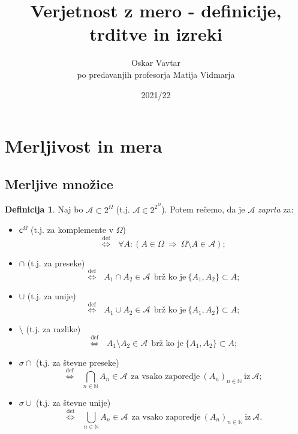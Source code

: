 \documentclass[11pt]{article}
\title{Verjetnost z mero - definicije, trditve in izreki}
\author{Oskar Vavtar \\
po predavanjih profesorja Matija Vidmarja}
\date{2021/22}
\newcommand{\N}{\mathbb{N}}
\newcommand{\A}{\mathcal{A}}
\renewcommand{\c}{\mathsf{c}}
\newcommand{\diff}{\overset{\text{def}}{\iff}}
\newcommand{\imp}{~\Rightarrow~}
\newcommand{\set}[1]{\{#1\}}
\newcommand{\1}{\mathbbm{1}}
\theoremstyle{definition}
\newtheorem{definicija}{Definicija}[section]
\theoremstyle{definition}
\theoremstyle{definition}
\theoremstyle{definition}
\begin{document}
\maketitle
\pagebreak
\tableofcontents
\pagebreak


\section{Merljivost in mera}
\vspace{0.5cm}


\subsection{Merljive množice}
\vspace{0.5cm}

\begin{definicija}

Naj bo $\A \subset 2^\Omega$ (t.j. $\A \in 2^{2^\Omega}$). Potem rečemo, da je $\A$ \textit{zaprta} za:
\begin{itemize}

\item $\c^\Omega$ (t.j. za komplemente v $\Omega$) 
$$\diff ~~~\forall A: (A \in \Omega \imp \Omega \setminus A \in \A);$$

\item $\cap$ (t.j. za preseke)
$$\diff ~~~A_1 \cap A_2 \in \A ~~\text{brž ko je}~ \set{A_1,A_2} \subset A;$$

\item $\cup$ (t.j. za unije)
$$\diff ~~~A_1 \cup A_2 \in \A ~~\text{brž ko je}~ \set{A_1,A_2} \subset A;$$

\item $\setminus$ (t.j. za razlike)
$$\diff ~~~A_1 \setminus A_2 \in \A ~~\text{brž ko je}~ \set{A_1,A_2} \subset A;$$

\item $\sigma\cap$ (t.j. za števne preseke)
$$\diff ~~~\bigcap_{n\in\N} A_n \in \A ~~\text{za vsako zaporedje}~ (A_n)_{n\in\N} ~\text{iz}~ \A;$$

\item $\sigma\cup$ (t.j. za števne unije)
$$\diff ~~~\bigcup_{n\in\N} A_n \in \A ~~\text{za vsako zaporedje}~ (A_n)_{n\in\N} ~\text{iz}~ \A.$$

\end{itemize}

\end{definicija}
\vspace{0.5cm}
\end{document}

